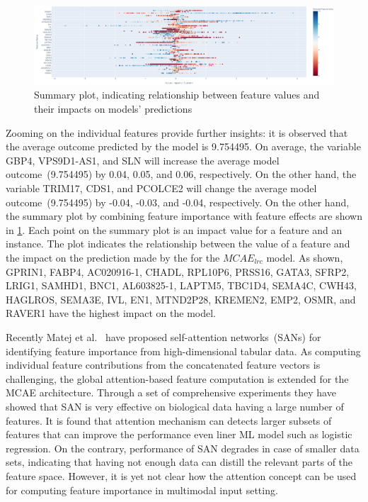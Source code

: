 \begin{figure}
    \centering
	\includegraphics[scale=0.6]{images/summary_plot.png}
	\caption{Summary plot, indicating relationship between feature values and their impacts on models' predictions}
    \label{fig:local_feature_impacts5}
\end{figure}

\hspace*{3.5mm} Zooming on the individual features provide further insights: it is observed that the average outcome predicted by the model is 9.754495. On average, the variable GBP4, VPS9D1-AS1, and SLN will increase the average model outcome~(9.754495) by 0.04, 0.05, and 0.06, respectively. On the other hand, the variable TRIM17, CDS1, and PCOLCE2 will change the average model outcome~(9.754495) by -0.04, -0.03, and -0.04, respectively. On the other hand, the summary plot by combining feature importance with feature effects are shown in \cref{fig:local_feature_impacts5}. Each point on the summary plot is an impact value for a feature and an instance. The plot indicates the relationship between the value of a feature and the impact on the prediction made by the for the $MCAE_{lrc}$ model. As shown, GPRIN1, FABP4, AC020916-1, CHADL, RPL10P6, PRSS16, GATA3, SFRP2, LRIG1, SAMHD1, BNC1, AL603825-1, LAPTM5, TBC1D4, SEMA4C, CWH43, HAGLROS, SEMA3E, IVL, EN1, MTND2P28, KREMEN2, EMP2, OSMR, and RAVER1 have the highest impact on the model. 


\hspace*{3.5mm} Recently Matej et al.~\cite{vskrlj2020feature} have proposed self-attention networks~(SANs) for identifying feature importance from high-dimensional tabular data. As computing individual feature contributions from the concatenated feature vectors is challenging, the global attention-based feature computation is extended for the MCAE architecture. Through a set of comprehensive experiments they have showed that SAN is very effective on biological data having a large number of features. It is found that attention mechanism can detects larger subsets of features that can improve the performance even liner ML model such as logistic regression. On the contrary, performance of SAN degrades in case of smaller data sets, indicating that having not enough data can distill the relevant parts of the feature space. However, it is yet not clear how the attention concept can be used for computing feature importance in multimodal input setting.

